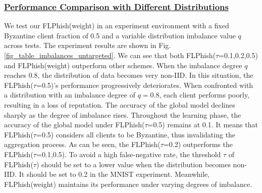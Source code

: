 \documentclass[journal]{IEEEtran}
\begin{document}
    \subsubsection{\ul{Performance Comparison with Different Distributions}} We test our FLPhish(weight) in an experiment environment with a fixed Byzantine client fraction of 0.5 and a variable distribution imbalance value $q$ across tests. The experiment results are shown in Fig. \ref{fig_table_imbalances_untargeted}. We can see that both FLPhish($\tau$=0.1,0.2,0.5) and FLPhish(weight) outperform other schemes. When the imbalance degree $q$ reaches 0.8, the distribution of data becomes very non-IID. In this situation, the FLPhish($\tau$=0.5)'s performance progressively deteriorates. When confronted with a distribution with an imbalance degree of $q=0.8$, each client performs poorly, resulting in a loss of reputation. The accuracy of the global model declines sharply as the degree of imbalance rises. Throughout the learning phase, the accuracy of the global model under FLPhish($\tau$=0.5) remains at 0.1. It means that FLPhish($\tau$=0.5) considers all clients to be Byzantine, thus invalidating the aggregation process. As can be seen, the FLPhish($\tau$=0.2) outperforms the FLPhish($\tau$=0.1,0.5). To avoid a high false-negative rate, the threshold $\tau$ of FLPhish($\tau$) should be set to a lower value when the distribution becomes non-IID. It should be set to 0.2 in the MNIST experiment. Meanwhile, FLPhish(weight) maintains its performance under varying degrees of imbalance.
    


    
\end{document}
